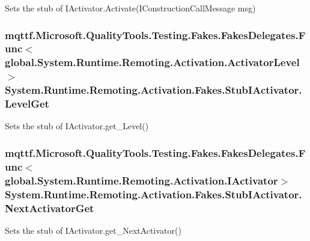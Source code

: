 Sets the stub of I\-Activator.\-Activate(\-I\-Construction\-Call\-Message msg)

\hypertarget{class_system_1_1_runtime_1_1_remoting_1_1_activation_1_1_fakes_1_1_stub_i_activator_a4d18dabe9c5f5d34e645f4839a63ef5e}{
\subsubsection[{Level\-Get}]{\setlength{\rightskip}{0pt plus 5cm}mqttf.\-Microsoft.\-Quality\-Tools.\-Testing.\-Fakes.\-Fakes\-Delegates.\-Func$<$global.\-System.\-Runtime.\-Remoting.\-Activation.\-Activator\-Level$>$ System.\-Runtime.\-Remoting.\-Activation.\-Fakes.\-Stub\-I\-Activator.\-Level\-Get}}\label{class_system_1_1_runtime_1_1_remoting_1_1_activation_1_1_fakes_1_1_stub_i_activator_a4d18dabe9c5f5d34e645f4839a63ef5e}


Sets the stub of I\-Activator.\-get\-\_\-\-Level()

\hypertarget{class_system_1_1_runtime_1_1_remoting_1_1_activation_1_1_fakes_1_1_stub_i_activator_a10e2a33f489830d59c2d1a58539d37f9}{
\subsubsection[{Next\-Activator\-Get}]{\setlength{\rightskip}{0pt plus 5cm}mqttf.\-Microsoft.\-Quality\-Tools.\-Testing.\-Fakes.\-Fakes\-Delegates.\-Func$<$global.\-System.\-Runtime.\-Remoting.\-Activation.\-I\-Activator$>$ System.\-Runtime.\-Remoting.\-Activation.\-Fakes.\-Stub\-I\-Activator.\-Next\-Activator\-Get}}\label{class_system_1_1_runtime_1_1_remoting_1_1_activation_1_1_fakes_1_1_stub_i_activator_a10e2a33f489830d59c2d1a58539d37f9}


Sets the stub of I\-Activator.\-get\-\_\-\-Next\-Activator()

